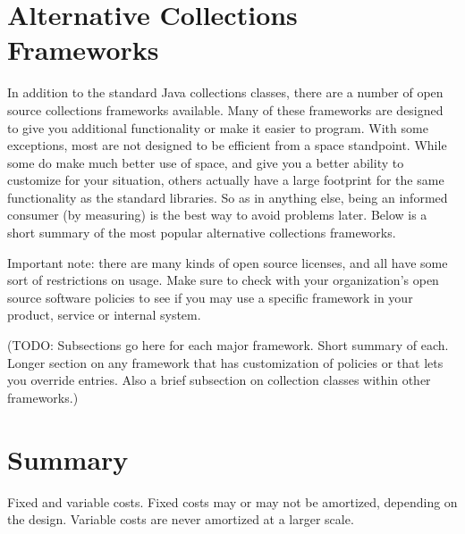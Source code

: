 \section{Alternative Collections Frameworks}
In addition to the standard Java collections classes, there are a number of
open source collections frameworks available. Many of these frameworks
are designed to give you additional functionality or make it easier to
program. With some exceptions, most are not designed to be efficient from a
space standpoint. While some do make much better use of space, and give you a
better ability to customize for your situation, others actually have a
large footprint for the same functionality as the standard libraries. So as in
anything else, being an informed consumer (by measuring) is the best way to
avoid problems later. Below is a short summary of the most
popular alternative collections frameworks.

Important note: there are many kinds of open source licenses, and all have some
sort of restrictions on usage. Make sure to check with your organization's open
source software policies to see if you may use a specific framework in 
your product, service or internal system.

(TODO: Subsections go here for each major framework. Short summary of each.
Longer section on any framework that has customization of policies or that lets you override
entries. Also a brief subsection on collection classes within other frameworks.)

\section{Summary}

Fixed and variable costs.  Fixed costs may or may not be amortized, depending on
the design.  Variable costs are never amortized at a larger scale.
